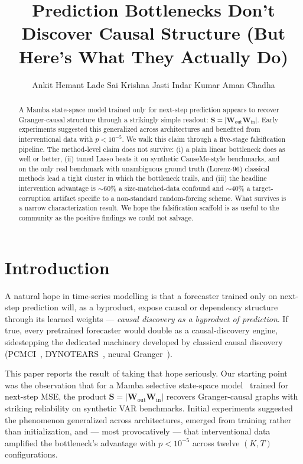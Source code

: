 \documentclass{article}
\title{Prediction Bottlenecks Don't Discover Causal Structure (But Here's What They Actually Do)}
\author{%
  Ankit Hemant Lade \quad Sai Krishna Jasti \quad Indar Kumar \quad Aman Chadha
}
\begin{document}
\maketitle

\begin{abstract}
A Mamba state-space model trained only for next-step prediction appears to
recover Granger-causal structure through a strikingly simple readout:
$\mathbf{S} = |\mathbf{W}_{\text{out}} \mathbf{W}_{\text{in}}|$. Early
experiments suggested this generalized across architectures and benefited
from interventional data with $p < 10^{-5}$. We walk this claim through a
five-stage falsification pipeline. The method-level claim does not survive:
(i) a plain linear bottleneck does as well or better, (ii) tuned Lasso
beats it on synthetic CauseMe-style benchmarks, and on the only real
benchmark with unambiguous ground truth (Lorenz-96) classical methods
lead a tight cluster in which the bottleneck trails, and
(iii) the headline intervention advantage is $\sim$60\% a size-matched-data
confound and $\sim$40\% a target-corruption artifact specific to a
non-standard random-forcing scheme. What survives is a narrow
characterization result. We hope the falsification scaffold is as useful
to the community as the positive findings we could not salvage.
\end{abstract}

\section{Introduction}

A natural hope in time-series modelling is that a forecaster trained only
on next-step prediction will, as a byproduct, expose causal or dependency
structure through its learned weights — \emph{causal discovery as a
byproduct of prediction}. If true, every pretrained forecaster would
double as a causal-discovery engine, sidestepping the dedicated
machinery developed by classical causal discovery
(PCMCI~\citep{runge2019pcmci}, DYNOTEARS~\citep{pamfil2020dynotears},
neural Granger~\citep{tank2021neural,nauta2019causal}).

This paper reports the result of taking that hope seriously. Our starting
point was the observation that for a Mamba selective state-space
model~\citep{gu2023mamba} trained for next-step MSE, the product
$\mathbf{S} = |\mathbf{W}_{\text{out}} \mathbf{W}_{\text{in}}|$ recovers
Granger-causal graphs with striking reliability on synthetic VAR
benchmarks. Initial experiments suggested the phenomenon generalized
across architectures, emerged from training rather than initialization,
and — most provocatively — that interventional data amplified the
bottleneck's advantage with $p < 10^{-5}$ across twelve $(K, T)$
configurations.
\end{document}
